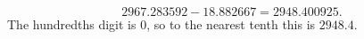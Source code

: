 \[2967.283592-18.882667=2948.400925.\]
The hundredths digit is $0$, so to the nearest tenth this is $\boxed{2948.4}$.
